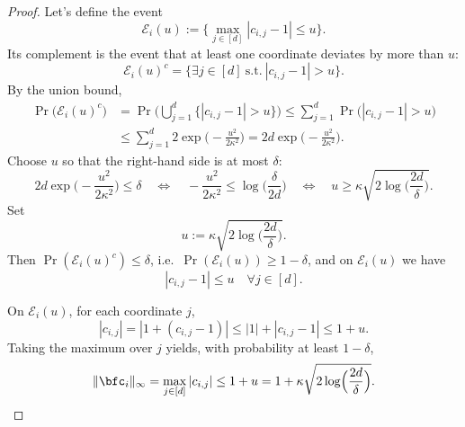 \documentclass[10pt]{article} %
\theoremstyle{definition}
\theoremstyle{plain}
\begin{document}
\begin{proof}
Let's define the event
\[
\mathcal E_i(u) := \Big\{\max_{j\in[d]} |c_{i,j}-1|\le u\Big\}.
\]
Its complement is the event that at least one coordinate deviates by more than $u$:
\[
\mathcal E_i(u)^c = \Big\{\exists j\in[d]\ \text{s.t.}\ |c_{i,j}-1|>u\Big\}.
\]
By the union bound,
\begin{align*}
\Pr\big(\mathcal E_i(u)^c\big)
&=
\Pr\Big(\bigcup_{j=1}^d \{|c_{i,j}-1|>u\}\Big)
\le \sum_{j=1}^d \Pr\big(|c_{i,j}-1|>u\big)
\\
&\le \sum_{j=1}^d 2\exp\!\Big(-\frac{u^2}{2\kappa^2}\Big)
= 2d\exp\!\Big(-\frac{u^2}{2\kappa^2}\Big).
\end{align*}
Choose $u$ so that the right-hand side is at most $\delta$:
\[
2d\exp\!\Big(-\frac{u^2}{2\kappa^2}\Big)\le \delta
\quad\Longleftrightarrow\quad
-\frac{u^2}{2\kappa^2}\le \log\!\Big(\frac{\delta}{2d}\Big)
\quad\Longleftrightarrow\quad
u\ge \kappa\sqrt{2\log\!\Big(\frac{2d}{\delta}\Big)}.
\]
Set
\[
u := \kappa\sqrt{2\log\!\Big(\frac{2d}{\delta}\Big)}.
\]
Then $\Pr(\mathcal E_i(u)^c)\le \delta$, i.e.\ $\Pr(\mathcal E_i(u))\ge 1-\delta$, and on $\mathcal E_i(u)$ we have
\[
|c_{i,j}-1|\le u \quad \forall j\in[d].
\]

On $\mathcal E_i(u)$, for each coordinate $j$,
\[
|c_{i,j}|
=|1+(c_{i,j}-1)|
\le |1|+|c_{i,j}-1|
\le 1+u.
\]
Taking the maximum over $j$ yields, with probability at least $1-\delta$,
\[
\|\bfc_i\|_\infty
=\max_{j\in[d]}|c_{i,j}|
\le 1+u
= 1+\kappa\sqrt{2\log\!\Big(\frac{2d}{\delta}\Big)}.
\]
\end{proof}
\end{document}
